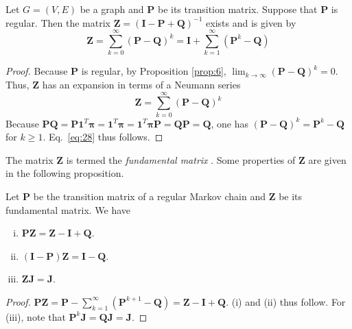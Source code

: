 \begin{proposition}
  \label{prop:7}
  Let $G = (V,E)$ be a graph and $\mathbf{P}$ be its transition
  matrix. Suppose that $\mathbf{P}$ is regular. Then the matrix $\mathbf{Z} =
  (\mathbf{I} - \mathbf{P} + \mathbf{Q})^{-1}$ exists and is given by
  \begin{equation}
    \label{eq:28}
    \mathbf{Z} = \sum_{k=0}^{\infty}(\mathbf{P} - \mathbf{Q})^{k} = \mathbf{I} +
    \sum_{k=1}^{\infty}(\mathbf{P}^{k} - \mathbf{Q})
  \end{equation}
  
\end{proposition}
\begin{proof}
  Because $\mathbf{P}$ is regular, by Proposition \ref{prop:6}, $\lim_{k
    \rightarrow \infty}(\mathbf{P} - \mathbf{Q})^{k} = 0$. Thus, $\mathbf{Z}$ has
  an expansion in terms of a Neumann series
  \begin{equation}
    \label{eq:29}
    \mathbf{Z} = \sum_{k=0}^{\infty}(\mathbf{P} - \mathbf{Q})^{k}
  \end{equation}
  Because $\mathbf{P}\mathbf{Q} = \mathbf{P}\bm{1}^{T}\bm{\pi} =
  \bm{1}^{T}\bm{\pi} = 
  \bm{1}^{T}\bm{\pi}\mathbf{P} = \mathbf{Q}\mathbf{P} = \mathbf{Q}$,  
  one has $(\mathbf{P} - \mathbf{Q})^{k} = \mathbf{P}^{k} - \mathbf{Q}$ for $k \geq
  1$. Eq.~\eqref{eq:28} thus follows. 
\end{proof}
The matrix $\mathbf{Z}$ is termed the {\em fundamental matrix}
\citep{kemeny83:_finit_markov_chain}. Some properties of
$\mathbf{Z}$ are given in the following proposition.
\begin{proposition}
  \label{prop:8}
  Let $\mathbf{P}$ be the transition matrix of a regular Markov chain and
  $\mathbf{Z}$ be its fundamental matrix. We have
  \begin{enumerate}[(i)]
  \item $\mathbf{P}\mathbf{Z} = \mathbf{Z} - \mathbf{I} + \mathbf{Q}$. 
  \item $(\mathbf{I} - \mathbf{P})\mathbf{Z} = \mathbf{I} - \mathbf{Q}$.
  \item $\mathbf{Z} \mathbf{J} = \mathbf{J}$. 
  \end{enumerate}
\end{proposition}
\begin{proof}
  $\mathbf{P}\mathbf{Z} = \mathbf{P} - \sum_{k=1}^{\infty}(\mathbf{P}^{k+1} - \mathbf{Q})
  = \mathbf{Z} - \mathbf{I} + \mathbf{Q}$. (i) and (ii) thus follow. For (iii),
  note that $\mathbf{P}^{k}\mathbf{J} = \mathbf{Q}\mathbf{J} = \mathbf{J}$. 
\end{proof}
